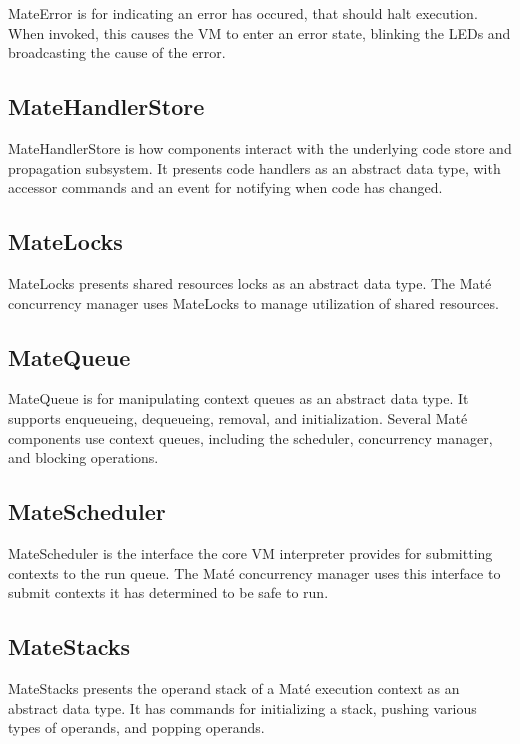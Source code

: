 \documentclass[12pt]{article}
\newcommand{\mate}{Mat\'{e}\xspace}
\begin{document}
MateError is for indicating an error has occured, that should halt
execution. When invoked, this causes the VM to enter an error state,
blinking the LEDs and broadcasting the cause of the error.

\subsection{MateHandlerStore}

MateHandlerStore is how components interact with the underlying code
store and propagation subsystem. It presents code handlers as an
abstract data type, with accessor commands and an event for notifying
when code has changed.

\subsection{MateLocks}

MateLocks presents shared resources locks as an abstract data
type. The \mate concurrency manager uses MateLocks to manage
utilization of shared resources.

\subsection{MateQueue}

MateQueue is for manipulating context queues as an abstract data
type. It supports enqueueing, dequeueing, removal, and
initialization. Several \mate components use context queues, including
the scheduler, concurrency manager, and blocking operations.

\subsection{MateScheduler}

MateScheduler is the interface the core VM interpreter provides for
submitting contexts to the run queue. The \mate concurrency manager
uses this interface to submit contexts it has determined to be safe to
run.

\subsection{MateStacks}

MateStacks presents the operand stack of a \mate execution context as
an abstract data type. It has commands for initializing a stack,
pushing various types of operands, and popping operands.
\end{document}
